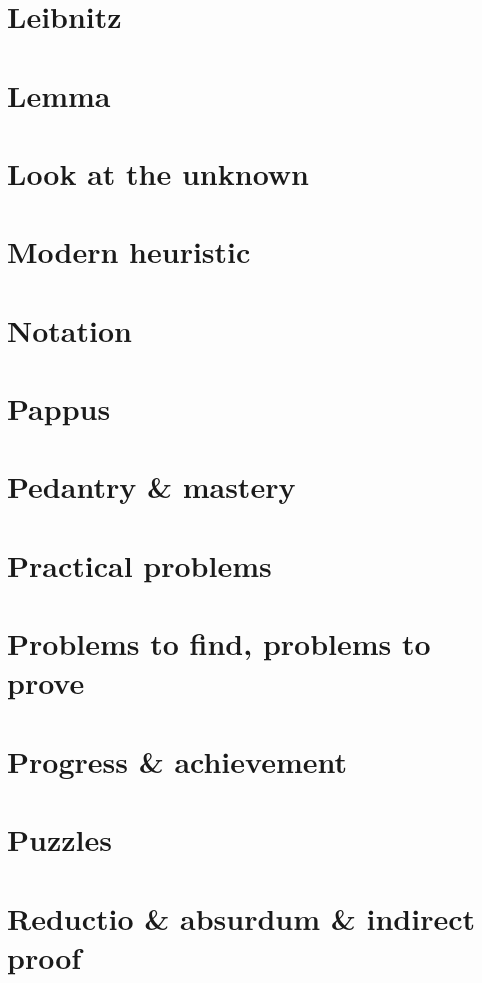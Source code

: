 \documentclass[oneside]{book}
\numberwithin{equation}{section}
\begin{document}
\section{Leibnitz}

\section{Lemma}

\section{Look at the unknown}

\section{Modern heuristic}

\section{Notation}

\section{Pappus}

\section{Pedantry \& mastery}

\section{Practical problems}

\section{Problems to find, problems to prove}

\section{Progress \& achievement}

\section{Puzzles}

\section{Reductio \& absurdum \& indirect proof}
\end{document}
